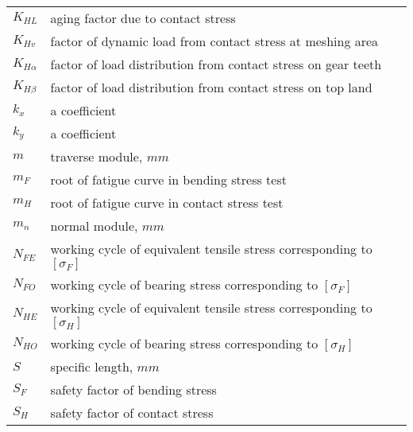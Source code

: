 \begin{tabular}[t]{lp{6.5cm}}
	$ K_{HL} $ & aging factor due to contact stress\\
	$ K_{Hv} $ & factor of dynamic load from contact stress at meshing area\\
	$ K_{H\alpha} $ & factor of load distribution from contact stress on gear teeth\\
	$ K_{H\beta} $ & factor of load distribution from contact stress on top land\\
	$ k_x $ & a coefficient\\
	$ k_y $ & a coefficient\\
	$ m $ & traverse module, $ \unit{mm} $\\
	$ m_F $ & root of fatigue curve in bending stress test\\
	$ m_H $ & root of fatigue curve in contact stress test\\
	$ m_n $ & normal module, $ \unit{mm} $\\
	$ N_{FE} $ & working cycle of equivalent tensile stress corresponding to $ [\sigma_F] $\\
	$ N_{FO} $ & working cycle of bearing stress corresponding to $ [\sigma_F] $\\
	$ N_{HE} $ & working cycle of equivalent tensile stress corresponding to $ [\sigma_H] $\\
	$ N_{HO} $ & working cycle of bearing stress corresponding to $ [\sigma_H] $\\
	$ S $ & specific length, $ \unit{mm} $\\
	$ S_F $ & safety factor of bending stress\\
		$ S_H $ & safety factor of contact stress\\
\end{tabular}
